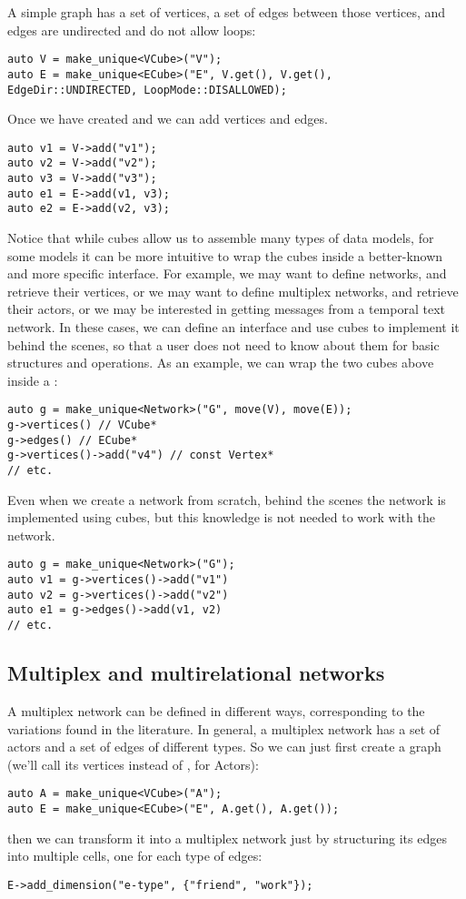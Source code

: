 A simple graph has a set of vertices, a set of edges between those vertices, and edges are undirected and do not allow loops:
\begin{lstlisting}[style=c++]
auto V = make_unique<VCube>("V");
auto E = make_unique<ECube>("E", V.get(), V.get(), EdgeDir::UNDIRECTED, LoopMode::DISALLOWED);
\end{lstlisting}
Once we have created  and  we can add vertices and edges.
\begin{lstlisting}[style=c++]
auto v1 = V->add("v1");
auto v2 = V->add("v2");
auto v3 = V->add("v3");
auto e1 = E->add(v1, v3);
auto e2 = E->add(v2, v3);
\end{lstlisting}
Notice that while cubes allow us to assemble many types of data models, for some models it can be more intuitive to wrap the cubes inside a better-known and more specific interface. For example, we may want to define networks, and retrieve their vertices, or we may want to define multiplex networks, and retrieve their actors, or we may be interested in getting messages from a temporal text network. In these cases, we can define an interface and use cubes to implement it behind the scenes, so that a user does not need to know about them for basic structures and operations. As an example, we can wrap the two cubes above inside a :
\begin{lstlisting}[style=c++]
auto g = make_unique<Network>("G", move(V), move(E));
g->vertices() // VCube*
g->edges() // ECube*
g->vertices()->add("v4") // const Vertex*
// etc.
\end{lstlisting}
Even when we create a network from scratch, behind the scenes the network is implemented using cubes, but this knowledge is not needed to work with the network.
\begin{lstlisting}[style=c++]
auto g = make_unique<Network>("G");
auto v1 = g->vertices()->add("v1") 
auto v2 = g->vertices()->add("v2") 
auto e1 = g->edges()->add(v1, v2) 
// etc.
\end{lstlisting}



\subsection{Multiplex and multirelational networks}

A multiplex network can be defined in different ways, corresponding to the variations found in the literature. In general, a multiplex network has a set of actors and a set of edges of different types.
So we can just first create a graph (we'll call its vertices  instead of , for Actors):
\begin{lstlisting}[style=c++]
auto A = make_unique<VCube>("A");
auto E = make_unique<ECube>("E", A.get(), A.get());
\end{lstlisting}
then we can transform it into a multiplex network just by structuring its edges into multiple cells, one for each type of edges:
\begin{lstlisting}[style=c++]
E->add_dimension("e-type", {"friend", "work"});
\end{lstlisting}


